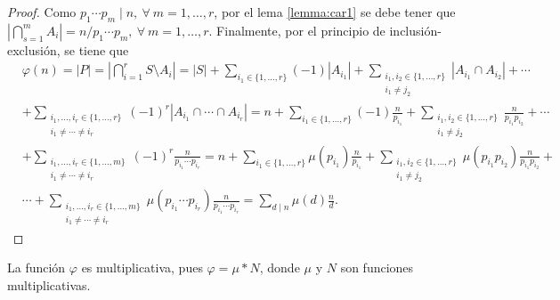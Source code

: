 \begin{proof}
Como $p_1 \cdots p_m \mid n,\:\forall \: m=1,\ldots,r$, por el lema \eqref{lemma:car1} se debe tener que  $|\bigcap_{s=1}^{m} A_i|=n/p_1 \cdots p_m,\:\forall \: m=1,\ldots,r$. Finalmente, por el principio de inclusión-exclusión, se tiene que 
\begin{align*}
	&\varphi(n) = |P| = \left|\bigcap_{i=1}^{r} S \setminus A_i\right| = |S|+\sum_{i_1\in \{1,\ldots,r\}} (-1)|A_{i_1}|+\sum_{\substack{i_1,i_2\in \{1,\ldots,r\} \\ i_1\neq j_2}} |A_{i_1} \cap A_{i_2}|+\cdots \\
	&+\sum_{\substack{i_1,\ldots,i_r\in \{1,\ldots,r\} \\ i_1\neq \cdots \neq i_r}} (-1)^{r}|A_{i_1}\cap \cdots\cap A_{i_r}| = n+\sum_{i_1\in \{1,\ldots,r\}} (-1)\frac{n}{p_{i_1}}+\sum_{\substack{i_1,i_2\in \{1,\ldots,r\} \\ i_1\neq j_2}} \frac{n}{p_{i_1}p_{i_2}} +\cdots \\
	&+\sum_{\substack{i_1,\ldots,i_r\in \{1,\ldots,m\} \\ i_1\neq \cdots \neq i_r}} (-1)^{r}\frac{n}{p_{i_1}\cdots p_{i_r}} = n+\sum_{i_1\in \{1,\ldots,r\}} \mu(p_{i_1})\frac{n}{p_{i_1}}+\sum_{\substack{i_1,i_2\in \{1,\ldots,r\} \\ i_1\neq j_2}} \mu(p_{i_1}p_{i_2})\frac{n}{p_{i_1}p_{i_2}} + \\
	&\cdots+\sum_{\substack{i_1,\ldots,i_r\in \{1,\ldots,m\} \\ i_1\neq \cdots \neq i_r}} \mu(p_{i_1}\cdots p_{i_r})\frac{n}{p_{i_1}\cdots p_{i_r}} = \sum_{d \mid n} \mu(d)\frac{n}{d}.
\end{align*}
\end{proof}

\begin{corollary}
La función $\varphi$ es multiplicativa, pues $\varphi = \mu * N$, donde $\mu$ y $N$ son funciones multiplicativas.
\end{corollary}
